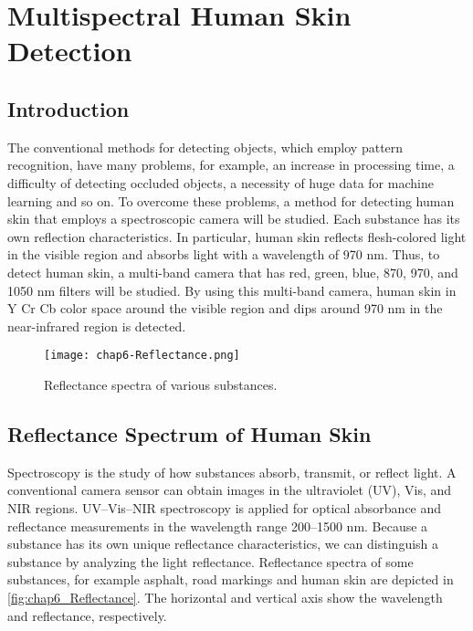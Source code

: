 \chapter{Multispectral Human Skin Detection}%

\label{Chapter6} %


\section{Introduction}
The conventional methods for detecting objects, which employ pattern
recognition, have many problems, for example, an increase in processing time, 
a difficulty of detecting occluded objects, a necessity of huge data for machine
learning and so on. To overcome these problems, a method for detecting human skin 
that employs a spectroscopic camera will be studied. Each substance has its
own reflection characteristics. In particular, human
skin reflects flesh-colored light in the visible region and
absorbs light with a wavelength of 970 nm. Thus, to detect human skin, 
a multi-band camera that has red, green, blue, 870, 970, and 1050 nm filters will be
studied. By using this multi-band camera, human
skin in Y Cr Cb color space around the visible region
and dips around 970 nm in the near-infrared region is detected. \cite{Kanzawa_humanskin}

\begin{figure}[ht]
  \centering
    \texttt{[image: chap6-Reflectance.png]}
  \caption{Reflectance spectra of various substances.}
  \label{fig:chap6_Reflectance}
\end{figure}

\section {Reflectance Spectrum of Human Skin}
Spectroscopy is the study of how substances absorb,
transmit, or reflect light. A conventional camera sensor
can obtain images in the ultraviolet (UV),
Vis, and NIR regions. UV–Vis–NIR spectroscopy is
applied for optical absorbance and reflectance measurements in the wavelength 
range 200–1500 nm. Because a substance has its own unique reflectance 
characteristics, we can distinguish a substance by analyzing the
light reflectance. Reflectance spectra of some substances, for example
asphalt, road markings and human skin are depicted in \autoref{fig:chap6_Reflectance}. 
The horizontal and vertical axis show the wavelength and reflectance, respectively.

